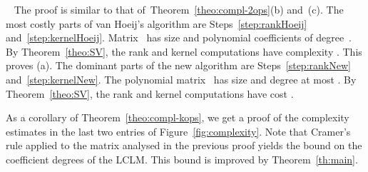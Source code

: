 \documentclass{sig-alt-full}
\def\myproof{\noindent{\sc Proof.}~}
\def\foorp{\hfill}
\begin{document}
\myproof
The proof is similar to that of~Theorem~\ref{theo:compl-2ops}(b) and~(c).
The most costly parts of van Hoeij's algorithm are
Steps~\ref{step:rankHoeij} and~\ref{step:kernelHoeij}.
Matrix~ has size  and  polynomial coefficients of degree~. By Theorem~\ref{theo:SV}, the rank and kernel computations have complexity . This proves (a).
The dominant parts of the new algorithm are
Steps~\ref{step:rankNew} and~\ref{step:kernelNew}. The polynomial matrix~ has size  and degree at most . By Theorem~\ref{theo:SV}, the rank and kernel computations have cost . 
\foorp

\smallskip
As a corollary of Theorem~\ref{theo:compl-kops}, we
get a proof of the complexity estimates in the last two entries of Figure~\ref{fig:complexity}. Note that Cramer's rule applied to the matrix  analysed in the previous proof yields the bound  on the coefficient degrees of the LCLM. This bound is improved by Theorem~\ref{th:main}.

\vspace{-0.1cm}
\end{document}
